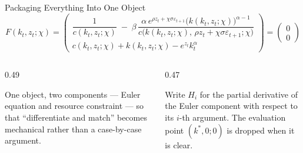 \begin{frame}{Packaging Everything Into One Object}
\small
\vspace{-1mm}
\[
F(k_t,z_t;\chi)=
\begin{pmatrix}
\dfrac{1}{c(k_t,z_t;\chi)}
\;-\;\beta\,\dfrac{\alpha\,e^{\rho z_t+\chi\sigma\varepsilon_{t+1}}\big(k(k_t,z_t;\chi)\big)^{\alpha-1}}
{c\Big(k(k_t,z_t;\chi),\,\rho z_t+\chi\sigma\varepsilon_{t+1};\chi\Big)}
\\[4mm]
c(k_t,z_t;\chi)+k(k_t,z_t;\chi)-e^{z_t}k_t^{\alpha}
\end{pmatrix}
=\begin{pmatrix}0\\[1mm]0\end{pmatrix}
\]
\medskip
\begin{columns}[T]
\begin{column}{0.49\textwidth}
\begin{conceptbox}[title=\textbf{Why bother}]\footnotesize
One object, two components --- Euler equation and resource constraint --- so that ``differentiate and match'' becomes mechanical rather than a case-by-case argument.
\end{conceptbox}
\end{column}
\begin{column}{0.47\textwidth}
\begin{examplebox}\footnotesize
Write $H_i$ for the partial derivative of the Euler component with respect to its $i$-th argument. The evaluation point $(k^{*},0;0)$ is dropped when it is clear.
\end{examplebox}
\end{column}
\end{columns}
\vspace{1mm}
\end{frame}

